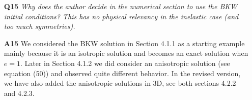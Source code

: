 \documentclass[11pt]{article}
\begin{document}
\begin{itemize}
\item[{\bf Q15}] {\it Why does the author decide in the numerical section to use the BKW initial conditions? This has no physical relevancy in the inelastic case (and too much symmetries).}

\item[{\bf A15}] We considered the BKW solution in Section 4.1.1 as a starting example mainly because it is an isotropic solution and becomes an exact solution when $e=1$. Later in Section 4.1.2 we did consider an anisotropic solution (see equation (50)) and observed quite different behavior. In the revised version, we have also added the anisotropic solutions in 3D, see both sections 4.2.2 and 4.2.3.



\end{itemize}
\end{document}
